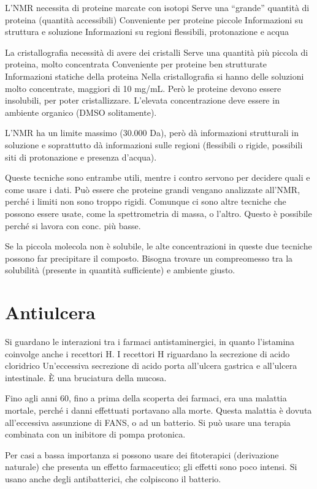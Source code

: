 L'NMR necessita di proteine marcate con isotopi Serve una ``grande'' quantità
di proteina (quantità accessibili) Conveniente per proteine piccole
Informazioni su struttura e soluzione Informazioni su regioni
flessibili, protonazione e acqua

La cristallografia necessità di avere dei cristalli Serve una quantità più piccola di
proteina, molto concentrata Conveniente per proteine ben strutturate
Informazioni statiche della proteina
Nella cristallografia si hanno delle soluzioni molto concentrate, maggiori di 10 mg/mL. Però le proteine devono essere insolubili, per
poter cristallizzare. L'elevata concentrazione deve essere in ambiente
organico (DMSO solitamente).

L'NMR ha un limite massimo (30.000 Da), però dà informazioni strutturali
in soluzione e soprattutto dà informazioni sulle regioni (flessibili o
rigide, possibili siti di protonazione e presenza d'acqua).

Queste tecniche sono entrambe utili, mentre i contro servono per
decidere quali e come usare i dati. Può essere che proteine grandi
vengano analizzate all'NMR, perché i limiti non sono troppo rigidi.
Comunque ci sono altre tecniche che possono essere usate, come la
spettrometria di massa, o l'altro. Questo è possibile perché si lavora
con conc. più basse.

Se la piccola molecola non è solubile, le alte concentrazioni in queste
due tecniche possono far precipitare il composto. Bisogna trovare un
compreomesso tra la solubilità (presente in quantità sufficiente) e
ambiente giusto.

\section{Antiulcera}

Si guardano le interazioni tra i farmaci antistaminergici, in quanto
l'istamina coinvolge anche i recettori H.
I recettori H riguardano la secrezione di acido cloridrico
Un'eccessiva secrezione di acido porta all'ulcera gastrica e all'ulcera
intestinale. È una bruciatura della mucosa.

Fino agli anni 60, fino a prima della scoperta dei farmaci, era una
malattia mortale, perché i danni effettuati portavano alla morte.
Questa malattia è dovuta all'eccessiva assunzione di FANS, o ad un
batterio.
Si può usare una terapia combinata con un inibitore di pompa protonica.

Per casi a bassa importanza si possono usare dei fitoterapici
(derivazione naturale) che presenta un effetto farmaceutico; gli effetti
sono poco intensi.
Si usano anche degli antibatterici, che colpiscono il batterio.

